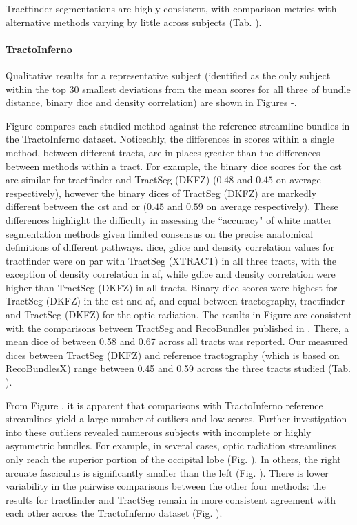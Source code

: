 Tractfinder segmentations are highly consistent, with comparison metrics with alternative methods varying by little across subjects (Tab. ).

\paragraph*{TractoInferno}

Qualitative results for a representative subject (identified as the only subject within the top 30 smallest deviations from the mean scores for all three of bundle distance, binary \gls{dice} and density correlation) are shown in Figures -.

Figure  compares each studied method against the reference streamline bundles in the TractoInferno dataset.
Noticeably, the differences in scores within a single method, between different tracts, are in places greater than the differences between methods within a tract.
For example, the binary \gls{dice} scores for the \gls{cst} are similar for tractfinder and TractSeg (DKFZ) ($0.48$ and $0.45$ on average respectively), however the binary \gls{dice}s of TractSeg (DKFZ) are markedly different between the \gls{cst} and \gls{or} ($0.45$ and $0.59$ on average respectively).
These differences highlight the difficulty in assessing the ``accuracy" of white matter segmentation methods given limited consensus on the precise anatomical definitions of different pathways.
\gls{dice}, \gls{gdice} and density correlation values for tractfinder were on par with TractSeg (XTRACT) in all three tracts, with the exception of density correlation in \gls{af}, while \gls{gdice} and density correlation were higher than TractSeg (DKFZ) in all tracts.
Binary \gls{dice} scores were highest for TractSeg (DKFZ) in the \gls{cst} and \gls{af}, and equal between tractography, tractfinder and TractSeg (DKFZ)  for the optic radiation.
The results in Figure  are consistent with the comparisons between TractSeg and RecoBundles published in \textcite{Wasserthal2018}.
There, a mean \gls{dice} of between 0.58 and 0.67 across all tracts was reported.
Our measured \gls{dice}s between TractSeg (DKFZ) and reference tractography (which is based on RecoBundlesX\autocite{Garyfallidis2018}) range between 0.45 and 0.59 across the three tracts studied (Tab. ).

From Figure , it is apparent that comparisons with TractoInferno reference streamlines yield a large number of outliers and low scores.
Further investigation into these outliers revealed numerous subjects with incomplete or highly asymmetric bundles.
For example, in several cases, optic radiation streamlines only reach the superior portion of the occipital lobe (Fig. ).
In others, the right arcuate fasciculus is significantly smaller than the left (Fig. ).
There is lower variability in the pairwise comparisons between the other four methods: the results for tractfinder and TractSeg remain in more consistent agreement with each other across the TractoInferno dataset (Fig. ).

